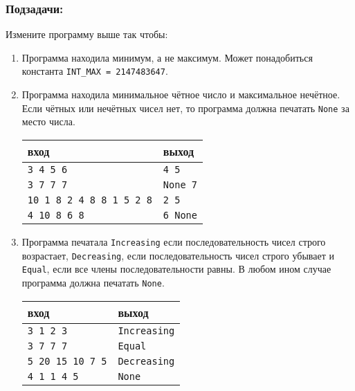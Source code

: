 \documentclass[10pt]{article}
\begin{document}
\subsubsection*{Подзадачи:}
Измените программу выше так чтобы:
\begin{enumerate}
\item Программа находила минимум, а не максимум. Может понадобиться константа \texttt{INT\_MAX = 2147483647}.
\item Программа находила минимальное чётное число и максимальное нечётное. Если чётных или нечётных чисел нет, то программа должна печатать \texttt{None} за место числа.
\begin{center}
\begin{tabular}{ l l }
 вход & выход \\ \hline
 \texttt{3 4 5 6} & \texttt{4 5}  \\ 
 \texttt{3 7 7 7} & \texttt{None 7}  \\
 \texttt{10 1 8 2 4 8 8 1 5 2 8} & \texttt{2 5} \\
 \texttt{4 10 8 6 8} & \texttt{6 None}
\end{tabular}
\end{center}

\item Программа печатала \texttt{Increasing} если последовательность чисел строго возрастает, \texttt{Decreasing}, если последовательность чисел строго убывает и \texttt{Equal}, если все члены последовательности равны. В любом ином случае программа должна печатать \texttt{None}.
\begin{center}
\begin{tabular}{ l l }
 вход & выход \\ \hline
 \texttt{3 1 2 3} & \texttt{Increasing}  \\ 
 \texttt{3 7 7 7} & \texttt{Equal}  \\
 \texttt{5 20 15 10 7 5} & \texttt{Decreasing}  \\ 
 \texttt{4 1 1 4 5} & \texttt{None}
\end{tabular}
\end{center}
\end{enumerate}
\end{document}
